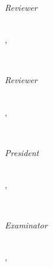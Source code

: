\begin{titlepage}
    \vfill
    {\large \thesisSubject} \\[5mm]
    {\LARGE \color{ctcolormain}\textbf{\thesisTitle} \\[10mm]}
    {\Large \thesisName} \\ [2mm]
    {\large \thesisUniversity \\
    \thesisUniversityDepartment} \\[4mm]

    \vfill
    \begin{minipage}[t]{.21\textwidth}
        \raggedleft
        {\small \textit{Reviewer}}
    \end{minipage}
    \hspace*{15pt}
    \begin{minipage}[t]{.7\textwidth}
        {\large \thesisFirstReviewer} \\
        {\small \thesisFirstReviewerTitle},
        {\small \thesisFirstReviewerUniversity}
    \end{minipage} \\[5mm]
    \begin{minipage}[t]{.21\textwidth}
        \raggedleft
        {\small \textit{Reviewer}}
    \end{minipage}
    \hspace*{15pt}
    \begin{minipage}[t]{.7\textwidth}
        {\large \thesisSecondReviewer} \\
        {\small \thesisSecondReviewerTitle},
        {\small \thesisSecondReviewerUniversity}
    \end{minipage} \\[5mm]
    \begin{minipage}[t]{.21\textwidth}
        \raggedleft
        {\small \textit{President}}
    \end{minipage}
    \hspace*{15pt}
    \begin{minipage}[t]{.7\textwidth}
        {\large \thesisPresident} \\
        {\small \thesisPresidentTitle},
        {\small \thesisPresidentUniversity}
    \end{minipage} \\[5mm]
    \begin{minipage}[t]{.21\textwidth}
        \raggedleft
        {\small \textit{Examinator}}
    \end{minipage}
    \hspace*{15pt}
    \begin{minipage}[t]{.7\textwidth}
        {\large \thesisExaminator} \\
        {\small \thesisExaminatorTitle},
        {\small \thesisExaminatorUniversity}
    \end{minipage} \\[5mm]


\end{titlepage}

